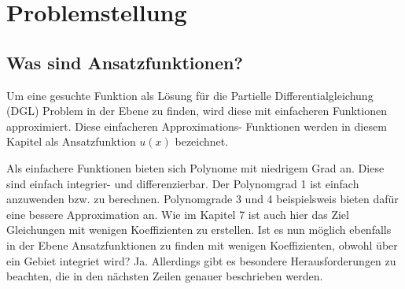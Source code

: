 %
%
%
\section{Problemstellung
\label{fem:section:problemstellung}}

\subsection{Was sind Ansatzfunktionen?}
Um eine gesuchte Funktion als Lösung für die Partielle Differentialgleichung (DGL) Problem in der Ebene zu finden, wird diese mit einfacheren Funktionen approximiert. Diese einfacheren Approximations- Funktionen werden in diesem Kapitel als Ansatzfunktion $u(x)$ bezeichnet. 

Als einfachere Funktionen bieten sich Polynome mit niedrigem Grad an. Diese sind einfach integrier- und differenzierbar. Der Polynomgrad 1 ist einfach anzuwenden bzw. zu berechnen. Polynomgrade 3 und 4 beispielsweis bieten dafür eine bessere Approximation an. Wie im Kapitel 7 ist auch hier das Ziel Gleichungen mit wenigen Koeffizienten zu erstellen. Ist es nun möglich ebenfalls in der Ebene Ansatzfunktionen zu finden mit wenigen Koeffizienten, obwohl über ein Gebiet integriet wird? Ja. Allerdings gibt es besondere Herausforderungen zu beachten, die in den nächsten Zeilen genauer beschrieben werden.



